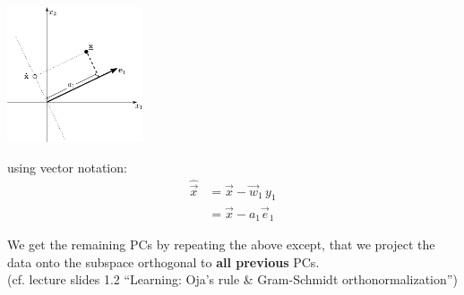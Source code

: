 \begin{frame}


\begin{center}
\includegraphics[width=4cm]{img/othogonality_novelty_less}
\end{center}

\notesonly{\label{eq:projorth} }using vector notation:
\begin{align}
\hat {\vec x} &= \vec x - \vec w_1 \, y_1\\
			&= \vec x - a_1 \vec e_1
\end{align}

\pause

We get the remaining PCs by repeating the above except, that we project 
the data onto the subspace orthogonal to \textbf{all previous} PCs.\\
(cf. lecture slides 1.2 ``Learning: Oja's rule \& Gram-Schmidt orthonormalization'')

\end{frame}


